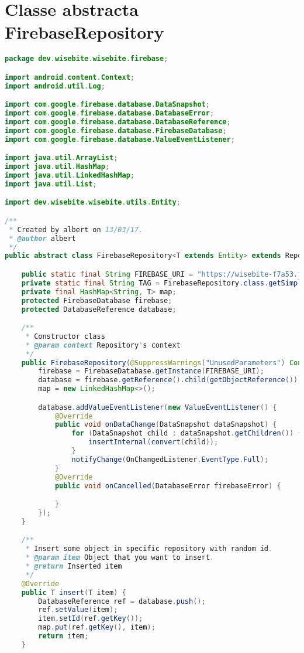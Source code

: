 \clearpage
\section{Classe abstracta FirebaseRepository}
\label{FirebaseRepository}

\begin{lstlisting}[language=java,firstnumber=1]
package dev.wisebite.wisebite.firebase;

import android.content.Context;
import android.util.Log;

import com.google.firebase.database.DataSnapshot;
import com.google.firebase.database.DatabaseError;
import com.google.firebase.database.DatabaseReference;
import com.google.firebase.database.FirebaseDatabase;
import com.google.firebase.database.ValueEventListener;

import java.util.ArrayList;
import java.util.HashMap;
import java.util.LinkedHashMap;
import java.util.List;

import dev.wisebite.wisebite.utils.Entity;

/**
 * Created by albert on 13/03/17.
 * @author albert
 */
public abstract class FirebaseRepository<T extends Entity> extends Repository<T> {

    public static final String FIREBASE_URI = "https://wisebite-f7a53.firebaseio.com/";
    private static final String TAG = FirebaseRepository.class.getSimpleName();
    private final HashMap<String, T> map;
    protected FirebaseDatabase firebase;
    protected DatabaseReference database;

    /**
     * Constructor class
     * @param context Repository's context
     */
    public FirebaseRepository(@SuppressWarnings("UnusedParameters") Context context) {
        firebase = FirebaseDatabase.getInstance(FIREBASE_URI);
        database = firebase.getReference().child(getObjectReference());
        map = new LinkedHashMap<>();

        database.addValueEventListener(new ValueEventListener() {
            @Override
            public void onDataChange(DataSnapshot dataSnapshot) {
                for (DataSnapshot child : dataSnapshot.getChildren()) {
                    insertInternal(convert(child));
                }
                notifyChange(OnChangedListener.EventType.Full);
            }
            @Override
            public void onCancelled(DatabaseError firebaseError) {

            }
        });
    }

    /**
     * Insert some object in specific repository with random id.
     * @param item Object that you want to insert.
     * @return Inserted item
     */
    @Override
    public T insert(T item) {
        DatabaseReference ref = database.push();
        ref.setValue(item);
        item.setId(ref.getKey());
        map.put(ref.getKey(), item);
        return item;
    }


\end{lstlisting}
